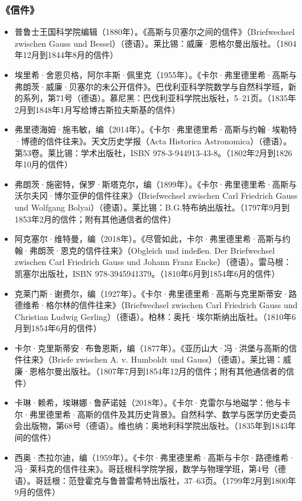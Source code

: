 \subsubsection{《信件》}
\begin{itemize}
\item 普鲁士王国科学院编辑（1880年）。《高斯与贝塞尔之间的信件》（Briefwechsel zwischen Gauss und Bessel）（德语）。莱比锡：威廉·恩格尔曼出版社。（1804年12月到1844年8月的信件）
\item 埃里希·舍恩贝格，阿尔丰斯·佩里克（1955年）。《卡尔·弗里德里希·高斯与弗朗茨·威廉·贝塞尔的未公开信件》。巴伐利亚科学院数学与自然科学班，新的系列，第71号（德语）。慕尼黑：巴伐利亚科学院出版社，5–21页。（1835年2月到1848年1月写给博古斯拉夫斯基的信件）
\item 弗里德海姆·施韦敏，编（2014年）。《卡尔·弗里德里希·高斯与约翰·埃勒特·博德的信件往来》。天文历史学报（Acta Historica Astronomica）（德语）。第53卷。莱比锡：学术出版社，ISBN 978-3-944913-43-8。（1802年2月到1826年10月的信件）
\item 弗朗茨·施密特，保罗·斯塔克尔，编（1899年）。《卡尔·弗里德里希·高斯与沃尔夫冈·博尔亚伊的信件往来》（Briefwechsel zwischen Carl Friedrich Gauss und Wolfgang Bolyai）（德语）。莱比锡：B.G.特布纳出版社。（1797年9月到1853年2月的信件；附有其他通信者的信件）
\item 阿克塞尔·维特曼，编（2018年）。《尽管如此，卡尔·弗里德里希·高斯与约翰·弗朗茨·恩克的信件往来》（Obgleich und indeßen. Der Briefwechsel zwischen Carl Friedrich Gauss und Johann Franz Encke）（德语）。雷马根：凯塞尔出版社，ISBN 978-3945941379。（1810年6月到1854年6月的信件）
\item 克莱门斯·谢费尔，编（1927年）。《卡尔·弗里德里希·高斯与克里斯蒂安·路德维希·格尔林的信件往来》（Briefwechsel zwischen Carl Friedrich Gauss und Christian Ludwig Gerling）（德语）。柏林：奥托·埃尔斯纳出版社。（1810年6月到1854年6月的信件）
\item 卡尔·克里斯蒂安·布鲁恩斯，编（1877年）。《亚历山大·冯·洪堡与高斯的信件往来》（Briefe zwischen A. v. Humboldt und Gauss）（德语）。莱比锡：威廉·恩格尔曼出版社。（1807年7月到1854年12月的信件；附有其他通信者的信件）
\item 卡琳·赖希，埃琳娜·鲁萨诺娃（2018年）。《卡尔·克雷尔与地磁学：他与卡尔·弗里德里希·高斯的信件及其历史背景》。自然科学、数学与医学历史委员会出版物，第68号（德语）。维也纳：奥地利科学院出版社。（1835年到1843年间的信件）
\item 西奥·杰拉尔迪，编（1959年）。《卡尔·弗里德里希·高斯与卡尔·路德维希·冯·莱科克的信件往来》。哥廷根科学院学报，数学与物理学班，第4号（德语）。哥廷根：范登霍克与鲁普雷希特出版社，37–63页。（1799年2月到1800年9月的信件）

\end{itemize}
